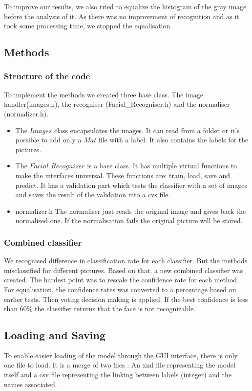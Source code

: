 To improve our results, we also tried to equalize the histogram of the gray image before the analysis of it. As there was no improvement of recognition and as it took some processing time, we stopped the equalisation.

\subsection{Methods}
\subsubsection{Structure of the code}

To implement the methods we created three base class. The image handler(images.h), the recogniser (Facial\_Recogniser.h) and the normaliser (normalizer.h).
\begin{itemize}
	\item The $Images$ class encapsulates the images. It can read from a folder or it's possible to add only a $Mat$ file with a label. It also contains the labels for the pictures.
	
	\item The $Facial\_Recognizer$ is a base class. It has multiple virtual functions to make the interfaces universal. These functions are: train, load, save and predict. It has a validation part which tests the classifier with a set of images and saves the result of the validation into a cvs file.
	
	\item normalizer.h
	The normaliser just reads the original image and gives back the normalised one. If the normalisation fails the original picture will be stored.
	
\end{itemize}

\subsubsection{Combined classifier}
We recognised difference in classification rate for each classifier. But the methods misclassified for different pictures. Based on that, a new combined classifier was created. The hardest point was to rescale the confidence rate for each method. For equalisation, the confidence rates was converted to a percentage based on earlier tests. Then voting decision making is applied. If the best confidence is less than 60\% the classifier returns that the face is not recognizable.

\subsection{Loading and Saving}
To enable easier loading of the model through the GUI interface, there is only one file to load. It is a merge of two files : An xml file representing the model itself and a csv file representing the linking between labels (integer) and the names associated.
